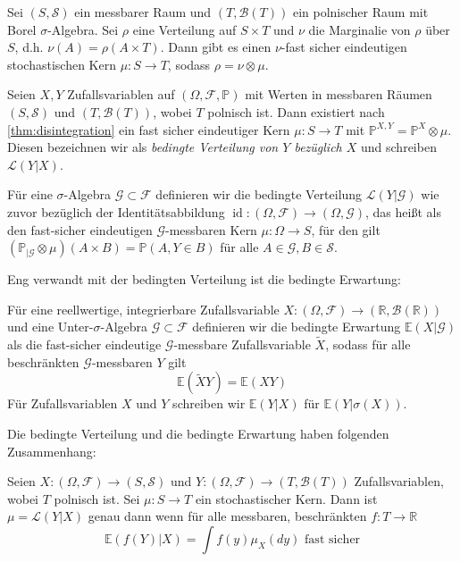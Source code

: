 \begin{theorem}\label{thm:disintegration}
Sei $(S, \mathcal{S})$ ein messbarer Raum und $(T,\mathcal{B}(T))$ ein polnischer Raum mit Borel $\sigma$-Algebra. Sei $\rho$ eine Verteilung auf $S\times T$ und $\nu$ die Marginalie von $\rho$ über $S$, d.h. $\nu(A) = \rho(A\times T)$. Dann gibt es einen $\nu$-fast sicher eindeutigen stochastischen Kern $\mu:S\rightarrow T$, sodass $\rho = \nu \otimes \mu$.
\end{theorem}
\begin{definition}
Seien $X, Y$ Zufallsvariablen auf $(\Omega, \mathcal{F}, \mathbb{P})$ mit Werten in messbaren Räumen $(S, \mathcal{S})$ und $(T, \mathcal{B}(T))$, wobei $T$ polnisch ist. Dann existiert nach \ref{thm:disintegration} ein fast sicher eindeutiger Kern $\mu: S\rightarrow T$ mit $\mathbb{P}^{X, Y}=\mathbb{P}^X\otimes \mu$. Diesen bezeichnen wir als \emph{bedingte Verteilung von $Y$ bezüglich $X$} und schreiben $\mathcal{L}(Y \vert X)$.

Für eine $\sigma$-Algebra $\mathcal{G} \subset \mathcal{F}$ definieren wir die bedingte Verteilung $\mathcal{L}(Y\vert \mathcal{G})$ wie zuvor bezüglich der Identitätsabbildung $\operatorname{id}:(\Omega, \mathcal{F}) \rightarrow (\Omega, \mathcal{G})$, das heißt als den fast-sicher eindeutigen $\mathcal{G}$-messbaren Kern $\mu:\Omega\rightarrow S$, für den gilt $\left(\mathbb{P}_{\vert \mathcal{G}} \otimes \mu\right)(A\times B)=\mathbb{P}(A, Y\in B)$ für alle $A \in \mathcal{G}, B\in \mathcal{S}$.
\end{definition}
Eng verwandt mit der bedingten Verteilung ist die bedingte Erwartung:
\begin{definition}
Für eine reellwertige, integrierbare Zufallsvariable $X: (\Omega, \mathcal{F}) \rightarrow (\mathbb{R}, \mathcal{B}(\mathbb{R}))$ und eine Unter-$\sigma$-Algebra $\mathcal{G}\subset \mathcal{F}$ definieren wir die bedingte Erwartung $\mathbb{E}(X\vert \mathcal{G})$ als die fast-sicher eindeutige $\mathcal{G}$-messbare Zufallsvariable $\tilde{X}$, sodass für alle beschränkten $\mathcal{G}$-messbaren $Y$ gilt
$$\mathbb{E}(\tilde{X}Y) = \mathbb{E}(XY)$$
Für Zufallsvariablen $X$ und $Y$ schreiben wir $\mathbb{E}(Y\vert X)$ für $\mathbb{E}(Y \vert \sigma(X))$.
\end{definition}
Die bedingte Verteilung und die bedingte Erwartung haben folgenden Zusammenhang:
\begin{lemma}\label{thm:law_expectancy_connection}
Seien $X: (\Omega, \mathcal{F})\rightarrow (S, \mathcal{S})$ und $Y: (\Omega, \mathcal{F})\rightarrow(T, \mathcal{B}(T))$ Zufallsvariablen, wobei $T$ polnisch ist. Sei $\mu: S\rightarrow T$ ein stochastischer Kern. Dann ist $\mu = \mathcal{L}(Y\vert X)$ genau dann wenn für alle messbaren, beschränkten $f: T\rightarrow \mathbb{R}$
$$\mathbb{E}(f(Y) \vert X) = \int f(y)\mu_X(dy) \text{ fast sicher}$$
\end{lemma}
